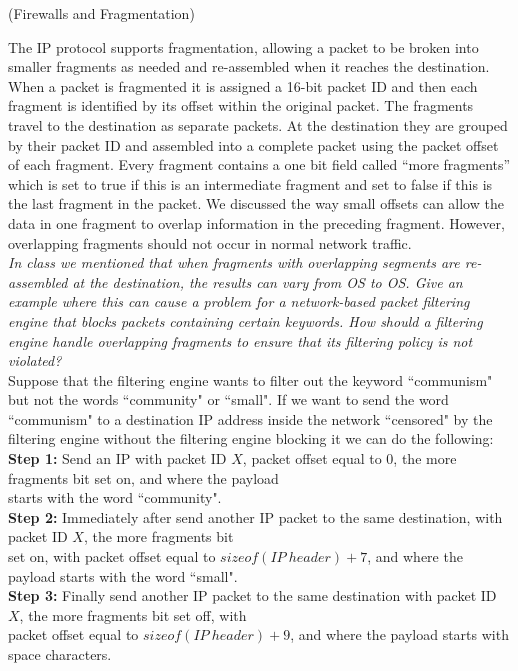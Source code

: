 \begin{prob}  (Firewalls and Fragmentation)
\end{prob}

\noindent The IP protocol supports fragmentation, allowing a packet to be broken into smaller fragments as needed and re-assembled when it reaches the destination. When a packet is fragmented it is assigned a 16-bit packet ID and then each fragment is identified by its offset within the original packet. The fragments travel to the destination as separate packets. At the destination they are grouped by their packet ID and assembled into a complete packet using the packet offset of each fragment. Every fragment contains a one bit field called ``more fragments'' which is set to true if this is an intermediate fragment and set to false if this is the last fragment in the packet. We discussed the way small offsets can allow the data in one fragment to overlap information in the preceding fragment. However, overlapping fragments should not occur in normal network traffic.\\

\textit{In class we mentioned that when fragments with overlapping segments are re-assembled at the destination, the results can vary from OS to OS. Give an example where this can cause a problem for a network-based packet filtering engine that blocks packets containing certain keywords. How should a filtering engine handle overlapping fragments to ensure that its filtering policy is not violated?}\\

Suppose that the filtering engine wants to filter out the keyword ``communism" but not the words ``community" or ``small". If we want to send the word ``communism" to a destination IP address inside the network ``censored" by the filtering engine without the filtering engine blocking it we can do the following:\\
\indent \textbf{Step 1: }Send an IP with packet ID $X$, packet offset equal to 0, the more fragments bit set on, and where the payload\\\indent starts with the word ``community".\\
\indent \textbf{Step 2: }Immediately after send another IP packet to the same destination, with packet ID $X$, the more fragments bit\\\indent set on, with packet offset equal to $sizeof(IP\ header) + 7$, and where the payload starts with the word ``small".\\
\indent \textbf{Step 3: }Finally send another IP packet to the same destination with packet ID $X$, the more fragments bit set off, with\\\indent packet offset equal to $sizeof(IP\ header)+9$, and where the payload starts with space characters.\\

